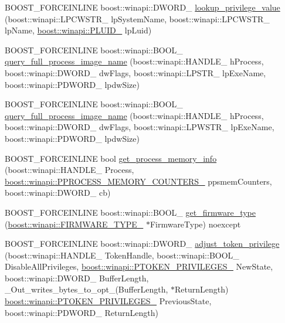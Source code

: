 \begin{DoxyCompactItemize}
B\+O\+O\+S\+T\+\_\+\+F\+O\+R\+C\+E\+I\+N\+L\+I\+NE boost\+::winapi\+::\+D\+W\+O\+R\+D\+\_\+ \mbox{\hyperlink{namespaceboost_1_1winapi_a8082af868b44ac9e0c37472e376f0983}{lookup\+\_\+privilege\+\_\+value}} (boost\+::winapi\+::\+L\+P\+C\+W\+S\+T\+R\+\_\+ lp\+System\+Name, boost\+::winapi\+::\+L\+P\+C\+W\+S\+T\+R\+\_\+ lp\+Name, \mbox{\hyperlink{namespaceboost_1_1winapi_a9c163fdf2c6f3909b7d5af5652bc6727}{boost\+::winapi\+::\+P\+L\+U\+I\+D\+\_\+}} lp\+Luid)
\item 
B\+O\+O\+S\+T\+\_\+\+F\+O\+R\+C\+E\+I\+N\+L\+I\+NE boost\+::winapi\+::\+B\+O\+O\+L\+\_\+ \mbox{\hyperlink{namespaceboost_1_1winapi_a7ab15fe99afc7fa21e7cbe076b3bb51f}{query\+\_\+full\+\_\+process\+\_\+image\+\_\+name}} (boost\+::winapi\+::\+H\+A\+N\+D\+L\+E\+\_\+ h\+Process, boost\+::winapi\+::\+D\+W\+O\+R\+D\+\_\+ dw\+Flags, boost\+::winapi\+::\+L\+P\+S\+T\+R\+\_\+ lp\+Exe\+Name, boost\+::winapi\+::\+P\+D\+W\+O\+R\+D\+\_\+ lpdw\+Size)
\item 
B\+O\+O\+S\+T\+\_\+\+F\+O\+R\+C\+E\+I\+N\+L\+I\+NE boost\+::winapi\+::\+B\+O\+O\+L\+\_\+ \mbox{\hyperlink{namespaceboost_1_1winapi_a42627a807148ac1d72e5eec95aacb3e7}{query\+\_\+full\+\_\+process\+\_\+image\+\_\+name}} (boost\+::winapi\+::\+H\+A\+N\+D\+L\+E\+\_\+ h\+Process, boost\+::winapi\+::\+D\+W\+O\+R\+D\+\_\+ dw\+Flags, boost\+::winapi\+::\+L\+P\+W\+S\+T\+R\+\_\+ lp\+Exe\+Name, boost\+::winapi\+::\+P\+D\+W\+O\+R\+D\+\_\+ lpdw\+Size)
\item 
B\+O\+O\+S\+T\+\_\+\+F\+O\+R\+C\+E\+I\+N\+L\+I\+NE bool \mbox{\hyperlink{namespaceboost_1_1winapi_a3edb324fb9a43e7c8ee11c5773c1f379}{get\+\_\+process\+\_\+memory\+\_\+info}} (boost\+::winapi\+::\+H\+A\+N\+D\+L\+E\+\_\+ Process, \mbox{\hyperlink{namespaceboost_1_1winapi_a20b1ddfc1a2c59a32e579b39b2d28f9d}{boost\+::winapi\+::\+P\+P\+R\+O\+C\+E\+S\+S\+\_\+\+M\+E\+M\+O\+R\+Y\+\_\+\+C\+O\+U\+N\+T\+E\+R\+S\+\_\+}} ppsmem\+Counters, boost\+::winapi\+::\+D\+W\+O\+R\+D\+\_\+ cb)
\item 
B\+O\+O\+S\+T\+\_\+\+F\+O\+R\+C\+E\+I\+N\+L\+I\+NE boost\+::winapi\+::\+B\+O\+O\+L\+\_\+ \mbox{\hyperlink{namespaceboost_1_1winapi_a7035334ec9418a5d061138f20e089f17}{get\+\_\+firmware\+\_\+type}} (\mbox{\hyperlink{namespaceboost_1_1winapi_ab2bb3265a50b62bf9ddb48517baf2b10}{boost\+::winapi\+::\+F\+I\+R\+M\+W\+A\+R\+E\+\_\+\+T\+Y\+P\+E\+\_\+}} $\ast$Firmware\+Type) noexcept
\item 
B\+O\+O\+S\+T\+\_\+\+F\+O\+R\+C\+E\+I\+N\+L\+I\+NE boost\+::winapi\+::\+D\+W\+O\+R\+D\+\_\+ \mbox{\hyperlink{namespaceboost_1_1winapi_aacdef11f59297ca9df5b711316c94757}{adjust\+\_\+token\+\_\+privilege}} (boost\+::winapi\+::\+H\+A\+N\+D\+L\+E\+\_\+ Token\+Handle, boost\+::winapi\+::\+B\+O\+O\+L\+\_\+ Disable\+All\+Privileges, \mbox{\hyperlink{namespaceboost_1_1winapi_a9d5f985cca2c6c8adc061e489ff44b99}{boost\+::winapi\+::\+P\+T\+O\+K\+E\+N\+\_\+\+P\+R\+I\+V\+I\+L\+E\+G\+E\+S\+\_\+}} New\+State, boost\+::winapi\+::\+D\+W\+O\+R\+D\+\_\+ Buffer\+Length, \+\_\+\+Out\+\_\+writes\+\_\+bytes\+\_\+to\+\_\+opt\+\_\+(Buffer\+Length, $\ast$Return\+Length) \mbox{\hyperlink{namespaceboost_1_1winapi_a9d5f985cca2c6c8adc061e489ff44b99}{boost\+::winapi\+::\+P\+T\+O\+K\+E\+N\+\_\+\+P\+R\+I\+V\+I\+L\+E\+G\+E\+S\+\_\+}} Previous\+State, boost\+::winapi\+::\+P\+D\+W\+O\+R\+D\+\_\+ Return\+Length)

\end{DoxyCompactItemize}
